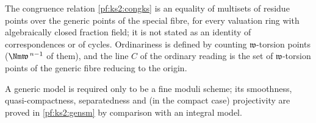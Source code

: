 \begin{remark}\label{pf:ks2:rem:ptid}
The congruence relation \cref{pf:ks2:congks} is an equality of multisets of residue points over the
generic points of the special fibre, for every valuation ring with algebraically closed fraction field;
it is not stated as an identity of correspondences or of cycles. Ordinariness is defined by counting
$\mathfrak w$-torsion points ($\Nm\mathfrak w^{\,n-1}$ of them), and the line $C$ of the ordinary reading is
the set of $\mathfrak w$-torsion points of the generic fibre reducing to the origin.
\end{remark}

\begin{remark}\label{pf:ks2:rem:generic}
A generic model is required only to be a fine moduli scheme; its smoothness, quasi-compactness,
separatedness and (in the compact case) projectivity are proved in \cref{pf:ks2:gensm} by comparison
with an integral model.
\end{remark}

